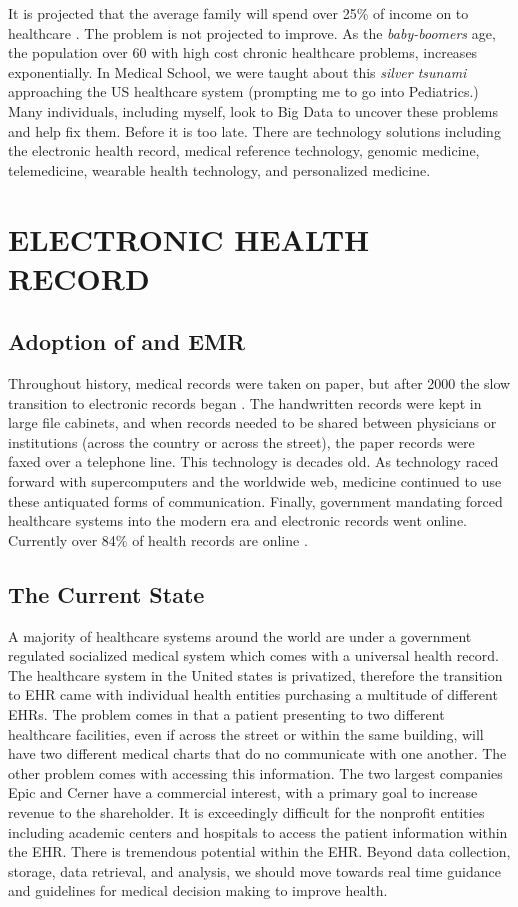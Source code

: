 \documentclass[sigconf]{acmart}
\begin{document}
It is projected that the average family will spend over 25\% of income
on to healthcare \cite{fox6}.  The problem is not projected to improve.  As
the {\em baby-boomers} age, the population over 60 with high cost chronic
healthcare problems, increases exponentially.  In Medical School, we
were taught about this {\em silver tsunami} approaching the US healthcare
system (prompting me to go into Pediatrics.)  Many individuals,
including myself, look to Big Data to uncover these problems and help
fix them. Before it is too late.  There are technology solutions
including the electronic health record, medical reference technology,
genomic medicine, telemedicine, wearable health technology, and
personalized medicine.

\section{ELECTRONIC HEALTH RECORD}

\subsection{Adoption of and EMR}

Throughout history, medical records were taken on paper, but after
2000 the slow transition to electronic records began
\cite{kokkonen2013use}. The handwritten records were kept in large
file cabinets, and when records needed to be shared between physicians
or institutions (across the country or across the street), the paper
records were faxed over a telephone line.  This technology is decades
old.  As technology raced forward with supercomputers and the
worldwide web, medicine continued to use these antiquated forms of
communication.  Finally, government mandating forced healthcare
systems into the modern era and electronic records went online.
Currently over 84\% of health records are online \cite{fox6}.

\subsection{	The Current State}

A majority of healthcare systems around the world are under a
government regulated socialized medical system which comes with a
universal health record. The healthcare system in the United states is
privatized, therefore the transition to EHR came with individual
health entities purchasing a multitude of different EHRs.  The problem
comes in that a patient presenting to two different healthcare
facilities, even if across the street or within the same building,
will have two different medical charts that do no communicate with one
another.  The other problem comes with accessing this information.
The two largest companies Epic and Cerner have a commercial interest,
with a primary goal to increase revenue to the shareholder.  It is
exceedingly difficult for the nonprofit entities including academic
centers and hospitals to access the patient information within the
EHR. There is tremendous potential within the EHR.  Beyond data
collection, storage, data retrieval, and analysis, we should move
towards real time guidance and guidelines for medical decision making
to improve health.
 
\end{document}
